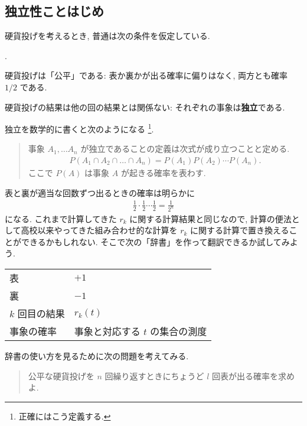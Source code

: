 \documentclass[openany, a4paper, oneside]{book}
\newcounter{enum2}
\renewenvironment{enumerate}{%
\begin{list}%
{%
\arabic{enum2}.\ \,%
}%
{%
\usecounter{enum2}
\setlength{\itemindent}{0pt}%
\setlength{\leftmargin}{6pt}%
\setlength{\rightmargin}{0pt}%
\setlength{\labelsep}{0pt}%
\setlength{\labelwidth}{6pt}%
\setlength{\itemsep}{0pt}%
\setlength{\parsep}{0pt}%
\setlength{\listparindent}{0pt}%
}
}{%
\end{list}%
}
\theoremstyle{break}
\theoremstyle{breakdefn}
\begin{document}
\subsection{独立性ことはじめ \label{Hinashiro_math_party_1_probability_13}}
\label{sec-8-1-4-5}

硬貨投げを考えるとき, 普通は次の条件を仮定している.
\begin{enumerate}
\item 硬貨投げは「公平」である: 表か裏かが出る確率に偏りはなく, 両方とも確率 $1/2$ である.
\item 硬貨投げの結果は他の回の結果とは関係ない: それぞれの事象は\textbf{独立}である.
\end{enumerate}
独立を数学的に書くと次のようになる \footnote{正確にはこう定義する.
 }.
\begin{quote}
事象 $A_1, \dots A_n$ が独立であることの定義は次式が成り立つことと定める.
\begin{align}
 P (A_1 \cap A_2 \cap \dots \cap A_n)
 =
 P (A_1) P (A_2) \cdots P (A_n).
\end{align}
ここで $P (A)$ は事象 $A$ が起きる確率を表わす.
\end{quote}

表と裏が適当な回数ずつ出るときの確率は明らかに
\begin{align}
 \frac{1}{2} \cdot \frac{1}{2} \cdots \frac{1}{2}
 =
 \frac{1}{2^n}
\end{align}
になる.
これまで計算してきた $r_k$ に関する計算結果と同じなので,
計算の便法として高校以来やってきた組み合わせ的な計算を $r_k$ に関する計算で置き換えることができるかもしれない.
そこで次の「辞書」を作って翻訳できるか試してみよう.

\begin{center}
\begin{tabular}{ll}
 表              &  $+1$                             \\
 裏              &  $-1$                             \\
 $k$ 回目の結果  &  $r_k (t)$                        \\
 事象の確率      &  事象と対応する $t$ の集合の測度  \\
\end{tabular}
\end{center}


辞書の使い方を見るために次の問題を考えてみる.
\begin{quote}
公平な硬貨投げを $n$ 回繰り返すときにちょうど $l$ 回表が出る確率を求めよ.
\end{quote}
\end{document}
